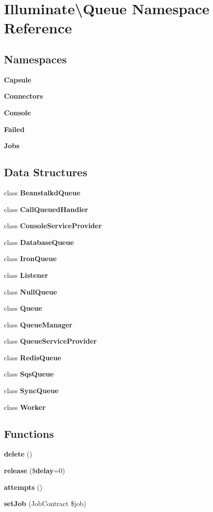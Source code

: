 \section{Illuminate\textbackslash{}Queue Namespace Reference}
\label{namespace_illuminate_1_1_queue}
\subsection*{Namespaces}
\begin{DoxyCompactItemize}
\item 
 {\bf Capsule}
\item 
 {\bf Connectors}
\item 
 {\bf Console}
\item 
 {\bf Failed}
\item 
 {\bf Jobs}
\end{DoxyCompactItemize}
\subsection*{Data Structures}
\begin{DoxyCompactItemize}
\item 
class {\bf Beanstalkd\+Queue}
\item 
class {\bf Call\+Queued\+Handler}
\item 
class {\bf Console\+Service\+Provider}
\item 
class {\bf Database\+Queue}
\item 
class {\bf Iron\+Queue}
\item 
class {\bf Listener}
\item 
class {\bf Null\+Queue}
\item 
class {\bf Queue}
\item 
class {\bf Queue\+Manager}
\item 
class {\bf Queue\+Service\+Provider}
\item 
class {\bf Redis\+Queue}
\item 
class {\bf Sqs\+Queue}
\item 
class {\bf Sync\+Queue}
\item 
class {\bf Worker}
\end{DoxyCompactItemize}
\subsection*{Functions}
\begin{DoxyCompactItemize}
\item 
{\bf delete} ()
\item 
{\bf release} (\${\bf delay}=0)
\item 
{\bf attempts} ()
\item 
{\bf set\+Job} (Job\+Contract \$job)
\end{DoxyCompactItemize}
